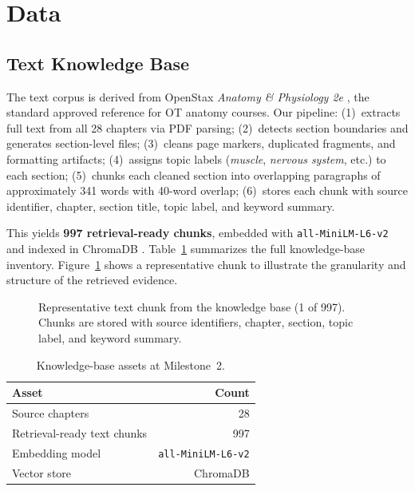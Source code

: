 \documentclass[11pt]{article}
\begin{document}
\section{Data}

\subsection{Text Knowledge Base}

The text corpus is derived from OpenStax \emph{Anatomy \& Physiology 2e}
\citep{openstax_ap2e}, the standard approved reference for OT anatomy courses.
Our pipeline: (1)~extracts full text from all 28 chapters via PDF parsing;
(2)~detects section boundaries and generates section-level files;
(3)~cleans page markers, duplicated fragments, and formatting artifacts;
(4)~assigns topic labels (\emph{muscle}, \emph{nervous system}, etc.) to each
section;
(5)~chunks each cleaned section into overlapping paragraphs of approximately
341 words with 40-word overlap;
(6)~stores each chunk with source identifier, chapter, section title, topic
label, and keyword summary.

This yields \textbf{997 retrieval-ready chunks}, embedded with
\texttt{all-MiniLM-L6-v2} \citep{allminilm_model} and indexed in
ChromaDB \citep{chroma_docs}.
Table~\ref{tab:kb-assets} summarizes the full knowledge-base inventory.
Figure~\ref{fig:chunk-sample} shows a representative chunk to illustrate
the granularity and structure of the retrieved evidence.

\begin{figure}[t]
\centering
{}
\caption{Representative text chunk from the knowledge base (1 of 997).
Chunks are stored with source identifiers, chapter, section, topic label,
and keyword summary.}
\label{fig:chunk-sample}
\end{figure}

\begin{table}[t]
\centering\small
\begin{tabularx}{\columnwidth}{@{}l r@{}}
\toprule
\textbf{Asset} & \textbf{Count} \\
\midrule
Source chapters & 28 \\
Retrieval-ready text chunks & 997 \\
Embedding model & \texttt{all-MiniLM-L6-v2} \\
Vector store & ChromaDB \\
\bottomrule
\end{tabularx}
\caption{Knowledge-base assets at Milestone~2.}
\label{tab:kb-assets}
\end{table}
\end{document}
